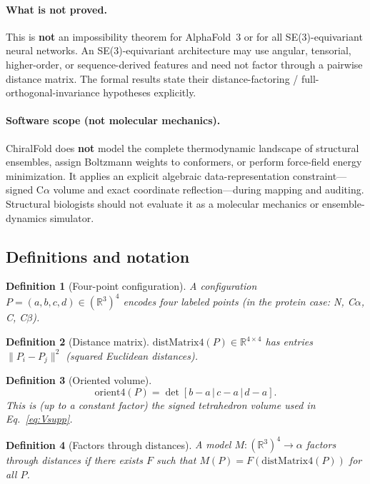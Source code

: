 \documentclass[11pt]{article}
\newtheorem{definition}{Definition}
\begin{document}
\paragraph{What is not proved.}
This is \textbf{not} an impossibility theorem for AlphaFold~3 or for all SE(3)-equivariant neural networks. An SE(3)-equivariant architecture may use angular, tensorial, higher-order, or sequence-derived features and need not factor through a pairwise distance matrix. The formal results state their distance-factoring / full-orthogonal-invariance hypotheses explicitly.

\paragraph{Software scope (not molecular mechanics).}
ChiralFold does \textbf{not} model the complete thermodynamic landscape of structural ensembles, assign Boltzmann weights to conformers, or perform force-field energy minimization. It applies an explicit algebraic data-representation constraint---signed C$\alpha$ volume and exact coordinate reflection---during mapping and auditing. Structural biologists should not evaluate it as a molecular mechanics or ensemble-dynamics simulator.

\subsection{Definitions and notation}

\begin{definition}[Four-point configuration]
A configuration $P=(a,b,c,d)\in(\mathbb{R}^3)^4$ encodes four labeled points (in the protein case: N, C$\alpha$, C, C$\beta$).
\end{definition}

\begin{definition}[Distance matrix]
$\mathrm{distMatrix4}(P)\in\mathbb{R}^{4\times4}$ has entries $\|P_i-P_j\|^2$ (squared Euclidean distances).
\end{definition}

\begin{definition}[Oriented volume]
\begin{equation}
\mathrm{orient4}(P)=\det[b-a\,|\,c-a\,|\,d-a].
\end{equation}
This is (up to a constant factor) the signed tetrahedron volume used in Eq.~\ref{eq:Vsupp}.
\end{definition}

\begin{definition}[Factors through distances]
A model $M:(\mathbb{R}^3)^4\to\alpha$ \emph{factors through distances} if there exists $F$ such that $M(P)=F(\mathrm{distMatrix4}(P))$ for all $P$.
\end{definition}
\end{document}
